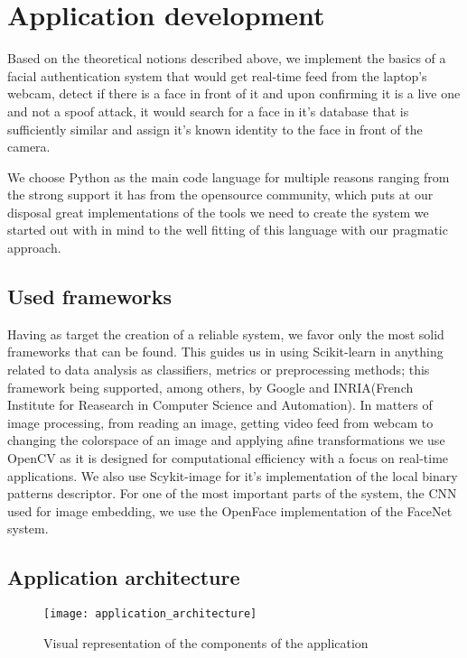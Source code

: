 \chapter{Application development}
Based on the theoretical notions described above, we implement the basics of a facial authentication system that would get real-time feed from the laptop's webcam, detect if there is a face in front of it and upon confirming it is a live one and not a spoof attack, it would search for a face in it's database that is sufficiently similar and assign it's known identity to the face in front of the camera.	


We choose Python as the main code language for multiple reasons ranging from the strong support it has from the opensource community, which puts at our disposal great implementations of the tools we need to create the system we started out with in mind to the well fitting of this language with our pragmatic approach.
\section{Used frameworks}
Having as target the creation of a reliable system, we favor only the most solid frameworks that can be found. This guides us in using Scikit-learn \cite{scikit-learn} in anything related to data analysis as classifiers, metrics or preprocessing methods; this framework being supported, among others, by Google and INRIA(French Institute for Reasearch in Computer Science and Automation). In matters of image processing, from reading an image, getting video feed from webcam to changing the colorspace of an image and applying afine transformations we use OpenCV \cite{opencv_library} as it is designed for computational efficiency with a focus on real-time applications. We also use Scykit-image \cite{scikit-image} for it's implementation of the local binary patterns descriptor. For one of the most important parts of the system, the CNN used for image embedding, we use the OpenFace \cite{amos2016openface} implementation of the FaceNet \cite{SchroffKP15} system.
\section{Application architecture}

\begin{figure}
	\captionsetup{width=15cm,font=small}
	\begin{center}
		\texttt{[image: application\_architecture]}
		\caption[Application architecure]{Visual representation of the components of the application}
	\end{center}
	\label{fig:application_architecture}
\end{figure}

